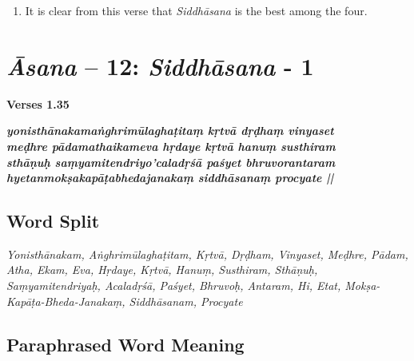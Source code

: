 \begin{enumerate}
\item It is clear from this verse that \textit{Siddhāsana} is the best among the four. 
\end{enumerate}

\section*{\textit{Āsana} -- 12: \textit{Siddhāsana} - 1}

\noindent 
\textbf{Verses 1.35}

\begin{shloka}
\textit{\textbf{yonisthānakamaṅghrimūlaghaṭitaṃ kṛtvā dṛḍhaṃ vinyaset}\\
\textbf{meḍhre pādamathaikameva hṛdaye kṛtvā hanuṃ susthiram}\\
\textbf{sthāṇuḥ saṃyamitendriyo'caladṛśā paśyet bhruvorantaram}\\
\textbf{hyetanmokṣakapāṭabhedajanakaṃ siddhāsanaṃ procyate ||}}
\end{shloka}

\subsection*{Word Split}

\textit{Yonisthānakam, Aṅghrimūlaghaṭitam, Kṛtvā, Dṛḍham, Vinyaset, Meḍhre, Pādam, Atha, Ekam, Eva, Hṛdaye, Kṛtvā, Hanuṃ, Susthiram, Sthāṇuḥ, Saṃyamitendriyaḥ, Acaladṛśā, Paśyet, Bhruvoḥ, Antaram, Hi, Etat, Mokṣa-Kapāṭa-Bheda-Janakaṃ, Siddhāsanam, Procyate}
\newpage
\subsection*{Paraphrased Word Meaning}

